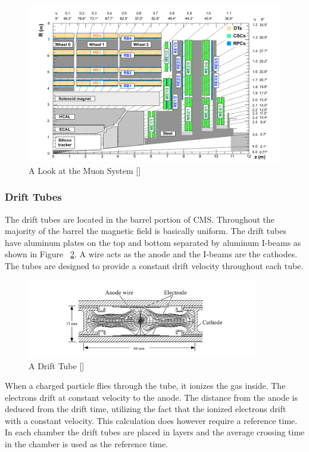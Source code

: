 \begin{figure}[h!]
  \centering
  \includegraphics[width=5.5in]{images/muon_system.png}
  \caption
   {A Look at the Muon System [\cite{muonsys}]}
  \label{fig:muonsysfig}
\end{figure}

\FloatBarrier
\subsubsection{Drift Tubes}

The drift tubes are located in the barrel portion of CMS. Throughout the majority of the barrel the magnetic field is basically uniform. The drift tubes have aluminum plates on the top and bottom separated by aluminum I-beams as shown in Figure ~\ref{fig:dt}. A wire acts as the anode and the I-beams are the cathodes. The tubes are designed to provide a constant drift velocity throughout each tube.
\begin{figure}[h!]
  \centering
  \includegraphics[width=4in]{images/DT.png}
  \caption
   {A Drift Tube [\cite{mutdr}]}
  \label{fig:dt}
\end{figure}

When a charged particle flies through the tube, it ionizes the gas inside. The electrons drift at constant velocity to the anode. The distance from the anode is deduced from the drift time, utilizing the fact that the ionized electrons drift with a constant velocity. This calculation does however require a reference time. In each chamber the drift tubes are placed in layers and the average crossing time in the chamber is used as the reference time.

